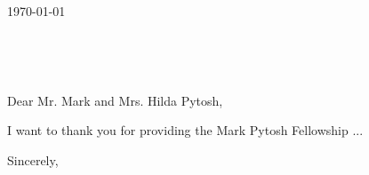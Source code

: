 \documentclass[11pt,a4paper]{letter} %
\def\opening#1{\thispagestyle{empty}
{\centering\fromaddress \vspace{0.6in} \\ %
\hspace*{\longindentation}\hspace*{\fill}\par} %
{\raggedright \toname \\ \toaddress \par} %
\vspace{0.4in} %
\noindent #1 %
}
\begin{document}

\begin{letter}
{\today}


\opening{Dear Mr. Mark and Mrs. Hilda Pytosh,}

I want to thank you for providing the Mark Pytosh Fellowship ...




\closing{Sincerely,}


\end{letter}
\end{document}
